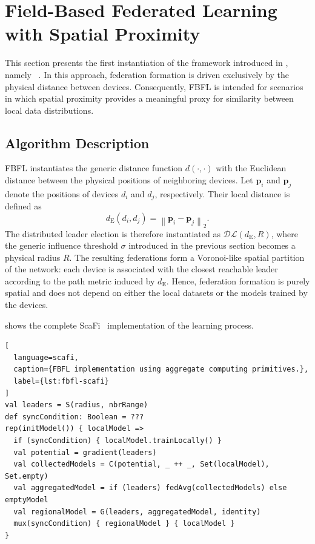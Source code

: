 \section{Field-Based Federated Learning with Spatial Proximity}
\label{sec:fbfl}

This section presents the first instantiation of the framework 
 introduced in , 
 namely ~\cite{DBLP:journals/lmcs/DominiAEV26}.
%
In this approach, 
 federation formation is driven exclusively by the physical distance between devices.
%
Consequently, 
 \gls{FBFL} is intended for scenarios in which spatial proximity provides a meaningful proxy 
 for similarity between local data distributions.


\subsection{Algorithm Description}
\label{sec:fbfl-spatial-algorithm}

\gls{FBFL} instantiates the generic distance function \(d(\cdot,\cdot)\) 
 with the Euclidean distance between the physical positions of neighboring devices.
%
Let \(\mathbf{p}_i\) and \(\mathbf{p}_j\) denote the positions 
 of devices \(d_i\) and \(d_j\), respectively.
%
Their local distance is defined as
%
\begin{equation}
  d_{\mathrm{E}}(d_i,d_j)
  =
  \left\lVert
    \mathbf{p}_i-\mathbf{p}_j
  \right\rVert_2.
  \label{eq:fbfl-euclidean-distance}
\end{equation}
%
The distributed leader election is therefore instantiated as
 \(\mathcal{DL}(d_{\mathrm{E}},R)\), where the generic influence threshold
 \(\sigma\) introduced in the previous section becomes a physical radius \(R\).
%
The resulting federations form a Voronoi-like spatial partition of the network:
 each device is associated with the closest reachable leader according to the
 path metric induced by \(d_{\mathrm{E}}\).
%
Hence, 
 federation formation is purely spatial and does not depend on either the
 local datasets or the models trained by the devices.

 shows the complete ScaFi~\cite{DBLP:journals/softx/CasadeiVAP22}
 implementation of the learning process.

\begin{lstlisting}[
  language=scafi,
  caption={FBFL implementation using aggregate computing primitives.},
  label={lst:fbfl-scafi}
]
val leaders = S(radius, nbrRange)
def syncCondition: Boolean = ???
rep(initModel()) { localModel =>
  if (syncCondition) { localModel.trainLocally() }
  val potential = gradient(leaders)
  val collectedModels = C(potential, _ ++ _, Set(localModel), Set.empty)
  val aggregatedModel = if (leaders) fedAvg(collectedModels) else emptyModel
  val regionalModel = G(leaders, aggregatedModel, identity) 
  mux(syncCondition) { regionalModel } { localModel }
}
\end{lstlisting}

